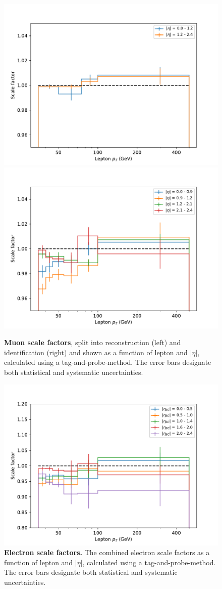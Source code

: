 \begin{figure}[t]
    \centering
    \includegraphics[width=0.49 \textwidth]{figures/ttxs/scalefactors/muonsf_reco.pdf}
    \hfill
    \includegraphics[width=0.49 \textwidth]{figures/ttxs/scalefactors/muonsf_id.pdf}
    \caption{\textbf{Muon scale factors}, split into reconstruction (left) and identification (right) and shown as a function of lepton \pt and $|\eta|$, calculated using a tag-and-probe-method. The error bars designate both statistical and systematic uncertainties. }
    \label{fig:ttxs:muonsf}
  \end{figure}
  
  \begin{figure}[t]
    \centering
    \includegraphics[width=0.49 \textwidth]{figures/ttxs/scalefactors/elesf.pdf}
    \caption{\textbf{Electron scale factors.} The combined electron scale factors as a function of lepton \pt and $|\eta|$, calculated using a tag-and-probe-method. The error bars designate both statistical and systematic uncertainties. }
    \label{fig:ttxs:elesf}
  \end{figure}

